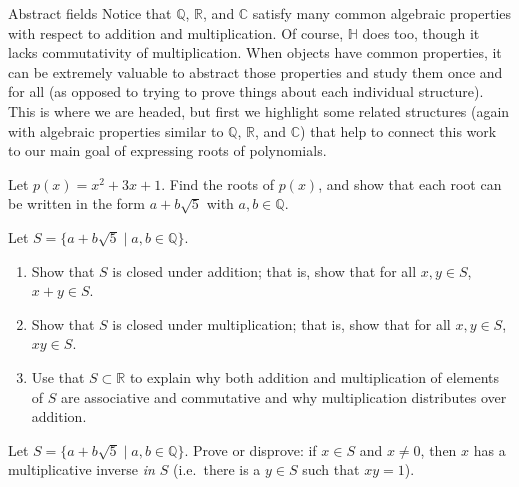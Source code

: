 \begin{section}{Abstract fields}
Notice that $\mathbb{Q}$, $\mathbb{R}$, and $\mathbb{C}$ satisfy many common algebraic properties with respect to addition and multiplication. Of course, $\mathbb{H}$ does too, though it lacks commutativity of multiplication. When objects have common properties, it can be extremely valuable to abstract  those properties and study them once and for all (as opposed to trying to prove things about each individual structure). This is where we are headed, but first we highlight some related structures (again with algebraic properties similar to $\mathbb{Q}$, $\mathbb{R}$, and $\mathbb{C}$) that help to connect this work to our main goal of expressing roots of polynomials.

\begin{problem}
Let $p(x) = x^2+3x+1$. Find the roots of $p(x)$, and show that each root can be written in the form $a+b\sqrt{5}$ with $a,b\in \mathbb{Q}$.
\end{problem}

\begin{problem}\label{prob.QAdjoinRoot5Closure}
Let $S=\{a+b\sqrt{5}\mid a,b\in \mathbb{Q}\}$. 
\begin{enumerate}
\item Show that $S$ is closed under addition; that is, show that for all $x,y\in S$, $x+y\in S$.
\item Show that $S$ is closed under multiplication; that is, show that for all $x,y\in S$, $xy\in S$.
\item Use that $S\subset \mathbb{R}$ to explain why both addition and multiplication of elements of $S$ are associative and commutative and why multiplication distributes over addition.
\end{enumerate}
\end{problem}

\begin{problem}\label{prob.QAdjoinRoot5Inverse}
Let $S=\{a+b\sqrt{5}\mid a,b\in \mathbb{Q}\}$. Prove or disprove: if $x\in S$ and $x\neq 0$, then $x$ has a multiplicative inverse \emph{in $S$} (i.e.~there is a $y\in S$ such that $xy=1$).
\end{problem}


\end{section}
